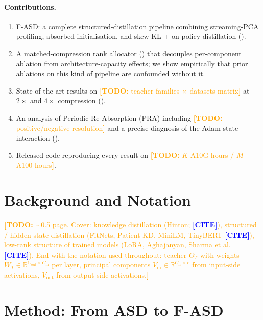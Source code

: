 \documentclass{article}
\newcommand{\todo}[1]{\textcolor{orange}{\textbf{[TODO:} #1\textbf{]}}}
\newcommand{\todocite}{\textcolor{blue}{\textbf{[CITE]}}}
\newcommand{\R}{\mathbb{R}}
\newcommand{\Vin}{V_{\mathrm{in}}}
\newcommand{\Vout}{V_{\mathrm{out}}}
\newcommand{\fasd}{\texorpdfstring{\textsc{F-ASD}}{F-ASD}}
\newcommand{\pra}{\texorpdfstring{\textsc{PRA}}{PRA}}
\begin{document}
\paragraph{Contributions.}
\begin{enumerate}[leftmargin=*,nosep]
  \item \fasd{}: a complete structured-distillation pipeline combining
        streaming-PCA profiling, absorbed initialisation, and skew-KL +
        on-policy distillation ().
  \item A matched-compression rank allocator () that
        decouples per-component ablation from architecture-capacity effects;
        we show empirically that prior ablations on this kind of pipeline
        are confounded without it.
  \item State-of-the-art results on \todo{teacher families × datasets matrix}
        at $2\times$ and $4\times$ compression ().
  \item An analysis of Periodic Re-Absorption (\pra{}) including
        \todo{positive/negative resolution} and a precise diagnosis of the
        Adam-state interaction ().
  \item Released code reproducing every result on
        \todo{$K$ A10G-hours / $M$ A100-hours}.
\end{enumerate}

\section{Background and Notation}
\label{sec:back}
\todo{$\sim$0.5 page. Cover: knowledge distillation (Hinton; \todocite),
structured / hidden-state distillation (FitNets, Patient-KD, MiniLM, TinyBERT
\todocite), low-rank structure of trained models (LoRA, Aghajanyan,
Sharma et al. \todocite). End with the notation used throughout: teacher
$\Theta_T$ with weights $W_T \in \R^{C_{\mathrm{out}}\times C_{\mathrm{in}}}$
per layer, principal components $\Vin \in \R^{C_{\mathrm{in}}\times c}$ from
input-side activations, $\Vout$ from output-side activations.}

\section{Method: From ASD to \fasd{}}
\label{sec:method}
\end{document}
